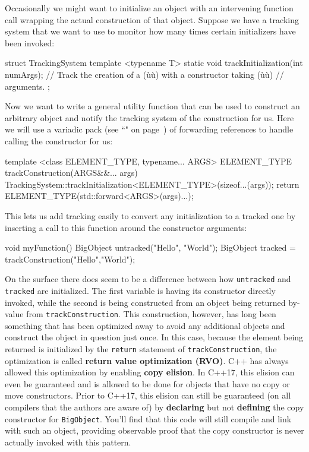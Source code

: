 Occasionally we might want to initialize an object with an intervening
function call wrapping the actual construction of that object. Suppose
we have a tracking system that we want to use to monitor how many times
certain initializers have been invoked:

\begin{emcppslisting}
struct TrackingSystem
{
    template <typename T>
    static void trackInitialization(int numArgs);
        // Track the creation of a (ù{}ù) with a constructor taking (ù{}ù)
        // arguments.
};
\end{emcppslisting}

\noindent Now we want to write a general utility function that can be used to
construct an arbitrary object and notify the tracking system of the
construction for us. Here we will use a variadic pack (see
``" on page~\pageref{variable-templates}) of forwarding references to handle
calling the constructor for us:

\begin{emcppslisting}
template <class ELEMENT_TYPE, typename... ARGS>
ELEMENT_TYPE trackConstruction(ARGS&&... args)
{
    TrackingSystem::trackInitialization<ELEMENT_TYPE>(sizeof...(args));
    return ELEMENT_TYPE(std::forward<ARGS>(args)...);
}
\end{emcppslisting}

\noindent This lets us add tracking easily to convert any initialization to a
tracked one by inserting a call to this function around the constructor
arguments:

\begin{emcppslisting}
void myFunction()
{
    BigObject untracked("Hello", "World");
    BigObject tracked = trackConstruction("Hello","World");
}
\end{emcppslisting}

\noindent On the surface there does seem to be a difference between how
\texttt{untracked} and \texttt{tracked} are initialized. The first
variable is having its constructor directly invoked, while the second is
being constructed from an object being returned by-value from
\texttt{trackConstruction}. This construction, however, has long been
something that has been optimized away to avoid any additional objects
and construct the object in question just once. In this case, because
the element being returned is initialized by the \texttt{return}
statement of \texttt{trackConstruction}, the optimization is called
\textbf{return value optimization (RVO)}. C++ has always
allowed this optimization by enabling \textbf{copy elision}. In C++17,
this elision can even be guaranteed and is allowed to be done for
objects that have no copy or move constructors. Prior to C++17, this
elision can still be guaranteed (on all compilers that the authors are
aware of) by \textbf{declaring} but not \textbf{defining} the copy
constructor for \texttt{BigObject}. You'll find that this code will
still compile and link with such an object, providing observable proof
that the copy constructor is never actually invoked with this pattern.

